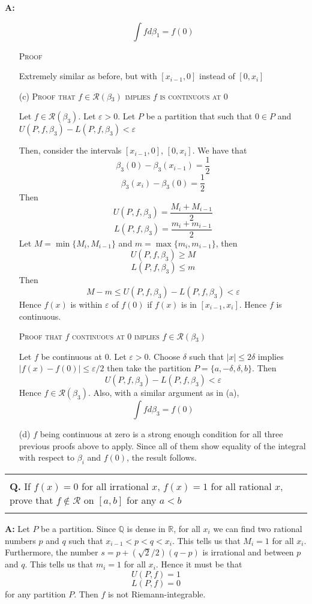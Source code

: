 \documentclass{article}
\newenvironment{myboxed}{\noindent\begin{tabular}{|p{.975\textwidth}|}\hline \\}{\\\\\hline\end{tabular}}
\newcounter{Question}
\newenvironment{Question} 
{\bigskip\begin{myboxed}\refstepcounter{Question}\par\noindent\textbf{Q\theQuestion.}}
{\end{myboxed}\bigskip}
\newenvironment{Answer} {\par\noindent\textbf{A:}} {}
\begin{document}
\begin{Answer}
\begin{itemize}
        \[\int f d\beta_1 = f(0)\]

        \textsc{Proof}

        Extremely similar as before, but with $[x_{i-1}, 0]$ instead of $[0, x_i]$

        \item [(c)]         
            \textsc{Proof that $f \in \mathscr{R}(\beta_3)$ implies $f$ is continuous at $0$}

            Let $f \in \mathscr{R}(\beta_3)$. Let $\varepsilon > 0$. Let $P$ be a partition that such that $0 \in P$ and $U(P, f, \beta_3) - L(P, f, \beta_3) < \varepsilon$

            Then, consider the intervals $[x_{i-1}, 0]$, $[0, x_i]$. We have that
            \[\beta_3(0) - \beta_3(x_{i-1}) = \frac{1}{2}\]
            \[\beta_3(x_i) - \beta_3(0) = \frac{1}{2}\]
            Then 
            \[U(P, f, \beta_3) = \frac{M_i + M_{i-1}}{2}\]
            \[L(P, f, \beta_3) = \frac{m_i + m_{i-1}}{2}\]
            Let $M = \min \{ M_i, M_{i-1} \}$ and $m = \max \{ m_i, m_{i-1}\}$, then
            \[U(P, f, \beta_3) \geq M \]
            \[L(P, f, \beta_3) \leq m\]
            Then 
            \[M - m \leq U(P, f, \beta_3) - L(P, f, \beta_3) < \varepsilon\]
            Hence $f(x)$ is within $\varepsilon$ of $f(0)$ if $f(x)$ is in $[x_{i-1}, x_i]$. Hence $f$ is continuous.

            \textsc{Proof that $f$ continuous at $0$ implies $f \in \mathscr{R}(\beta_3)$}

            Let $f$ be continuous at $0$. Let $\varepsilon > 0$. Choose $\delta$ such that $|x| \leq 2\delta$ implies $|f(x) - f(0)| \leq \varepsilon/2$ then take the partition $P = \{a, -\delta, \delta, b\}$. Then
        \[U(P, f, \beta_3) - L(P, f, \beta_3) < \varepsilon\]
        Hence $f \in \mathscr{R}(\beta_3)$. Also, with a similar argument as in (a), 
        \[\int f d\beta_3 = f(0)\]


        \item [(d)] 
            $f$ being continuous at zero is a strong enough condition for all three previous proofs above to apply. Since all of them show equality of the integral with respect to $\beta_i$ and $f(0)$, the result follows.
    \end{itemize}
\end{Answer}


\begin{Question}
    If $f(x) = 0$ for all irrational $x$, $f(x) = 1$ for all rational $x$, prove that $f \notin \mathscr{R}$ on $[a, b]$ for any $a < b$
\end{Question}
\begin{Answer}
    Let $P$ be a partition. Since $\mathbb{Q}$ is dense in $\mathbb{R}$, for all $x_i$ we can find two rational numbers $p$ and $q$ such that $x_{i-1} < p < q < x_i$. This tells us that $M_i = 1$ for all $x_i$. Furthermore, the number $s = p + (\sqrt{2}/2)(q-p)$ is irrational and between $p$ and $q$. This tells us that $m_i = 1$ for all $x_i$. Hence it must be that
    \[U(P, f) = 1\]
    \[L(P, f) = 0\]
    for any partition $P$. Then $f$ is not Riemann-integrable.
\end{Answer}
\end{document}
